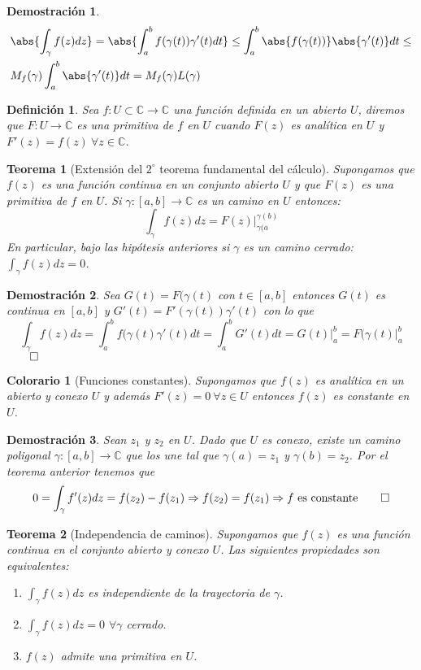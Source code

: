 \documentclass[10pt]{book}
\newtheorem{defi}{Definición}[chapter]
\newtheorem{theorem}{Teorema}[chapter]
\newtheorem*{dem}{Demostración}
\newtheorem{col}{Colorario}[chapter]
\newcommand{\C}{\mathbb{C}}
\newcommand{\f}{f: U\subset \C \longrightarrow \C}
\begin{document}
\begin{dem}
	\begin{align*}
		&\abs{\int_\gamma f(z)dz } = \abs{\int_a^b f(\gamma(t))\gamma'(t)dt}\leq \int_a^b \abs{f(\gamma(t))}\abs{\gamma'(t)}dt\leq\\
		&M_f(\gamma)\int_a^b\abs{\gamma'(t)}dt =  M_f(\gamma)L(\gamma)
	\end{align*}
\end{dem}

\begin{defi}
Sea $\f$ una función definida en un abierto $U$, diremos que $F: U \longrightarrow\C$ es una primitiva de $f$ en $U$ cuando $F(z)$ es analítica en $U$ y $F'(z) = f(z) \ \forall z \in\C$.
\end{defi}

\begin{theorem}[Extensión del $2^\circ$ teorema fundamental del cálculo]
Supongamos que $f(z)$ es una función continua en un conjunto abierto $U$ y que $F(z)$ es una primitiva de $f$ en $U$. Si $\gamma:[a,b]\longrightarrow \C$ es un camino en $U$ entonces:
$$\int_\gamma f(z)dz = F(z)\bigg|_{\gamma(a}^{\gamma(b)}$$
En particular, bajo las hipótesis anteriores si $\gamma$ es un camino cerrado: $\int_\gamma f(z)dz = 0$.
\end{theorem}

\begin{dem}
Sea $G(t) = F(\gamma(t)$ con $t\in [a,b]$ entonces $G(t)$ es continua en $[a,b]$ y $G'(t) = F'(\gamma(t))\gamma'(t)$ con lo que
$$\int_\gamma f(z)dz = \int_a^b f(\gamma(t)\gamma'(t)dt = \int_a^b G'(t)dt = G(t)\bigg|_a^b = F(\gamma(t)\bigg |_a^b $$ $\qed$
\end{dem}

\begin{col}[Funciones constantes]
Supongamos que $f(z)$ es analítica en un abierto y conexo $U$ y además $F'(z)=0 \ \forall z \in U$ entonces $f(z)$ es constante en $U$.
\end{col}

\begin{dem}
Sean $z_1$ y $z_2$ en $U$. Dado que $U$ es conexo, existe un camino poligonal $\gamma:[a,b] \longrightarrow \C$ que los une tal que $\gamma(a) = z_1$ y $\gamma(b) = z_2$. Por el teorema anterior tenemos que
$$0 = \int_{\gamma} f'(z)dz = f(z_2)-f(z_1) \Rightarrow f(z_2)=f(z_1) \Rightarrow f \text{ es constante} \qed$$
\end{dem}


\begin{theorem}[Independencia de caminos]
Supongamos que $f(z)$ es una función continua en el conjunto abierto y conexo $U$. Las siguientes propiedades son equivalentes:
\begin{enumerate}
\item $\displaystyle\int_{\gamma}f(z)dz$ es independiente de la trayectoria de $\gamma$.
\item  $\displaystyle\int_{\gamma}f(z)dz = 0$ $\forall \gamma$ cerrado.
\item $f(z)$ admite una primitiva en $U$.
\end{enumerate}
\end{theorem}
\end{document}
